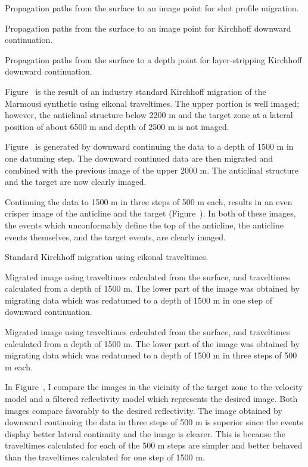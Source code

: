 {Propagation paths from the surface to an image point for shot 
profile migration.}

{Propagation paths from the surface to an image point for Kirchhoff downward
continuation.}

{Propagation paths from the surface to a depth point for layer-stripping
Kirchhoff downward continuation.}


Figure~ is the result of
an industry standard Kirchhoff migration
of the Marmousi synthetic using eikonal traveltimes. The upper
portion is well imaged; however, the anticlinal structure below 2200 m and
the target zone at a lateral position of about 6500 m 
and depth of 2500 m is not imaged.

Figure~ is generated by downward continuing the data
to a depth of 1500 m in one datuming step. The downward
continued data are then migrated and combined with the previous image of
the upper 2000 m. The anticlinal structure and the target are now clearly
imaged.

Continuing the data to 1500 m in three steps of 500 m each, results
in an even crisper
image of the anticline and the target (Figure~).
In both of these images,
the events which unconformably define the top of the anticline,
the anticline events themselves, and the target events, are clearly
imaged.

{Standard Kirchhoff migration using eikonal traveltimes.}

{Migrated image using traveltimes calculated from the surface, and
traveltimes calculated from a depth of 1500 m.
The lower part of the image was obtained by migrating data which
was redatumed to a depth of 1500 m in one step
of downward continuation.}

{Migrated image using traveltimes calculated from the surface, and 
traveltimes calculated from a depth of 1500 m.
The lower part of the image was obtained by migrating data which
was redatumed to a depth of 1500 m in three steps of 500 m each.}

In Figure~, I compare the images in the vicinity
of the target zone to the velocity model and a filtered reflectivity
model which represents the desired image.
Both images compare favorably to the desired reflectivity.
The image obtained by downward continuing the data in three steps
of 500 m is superior since the events display 
better lateral continuity and the image is clearer.
This is because the traveltimes calculated for each of the 500 m steps
are simpler and better behaved than the traveltimes calculated
for one step of 1500 m.


